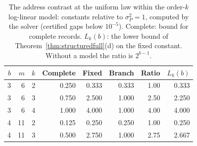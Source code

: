 \begin{table}[h]
\centering
\caption{The address contrast at the uniform law within the order-$k$ log-linear model: constants relative to $\sigma_P^2=1$, computed by the solver (certified gaps below $10^{-5}$). Complete: bound for complete records. $L_k(b)$: the lower bound of Theorem~\ref{thm:structuredfull}(d) on the fixed constant. Without a model the ratio is $2^{b-1}$.}
\label{tab:addressmodel}
\small
\begin{tabular}{rrrrrrrr}
\toprule
$b$ & $m$ & $k$ & Complete & Fixed & Branch & Ratio & $L_k(b)$ \\
\midrule
3 & 6 & 2 & 0.250 & 0.333 & 0.333 & 1.00 & 0.333 \\
3 & 6 & 3 & 0.750 & 2.500 & 1.000 & 2.50 & 2.250 \\
3 & 6 & 4 & 1.000 & 4.000 & 1.000 & 4.00 & 4.000 \\
4 & 11 & 2 & 0.125 & 0.250 & 0.250 & 1.00 & 0.250 \\
4 & 11 & 3 & 0.500 & 2.750 & 1.000 & 2.75 & 2.667 \\
\bottomrule
\end{tabular}
\end{table}
